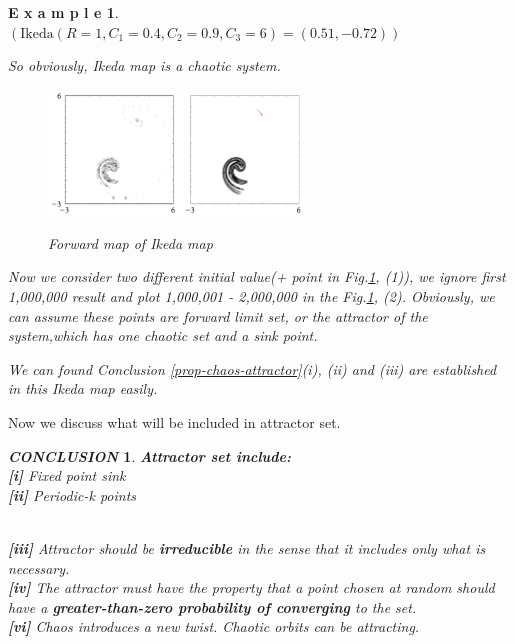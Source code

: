 \documentclass[12pt]{article}
\theoremstyle{plain}
\newtheorem{example}{\textbf{E x a m p l e}}[section]
\newtheorem{conclusion}{\textit{\textbf{CONCLUSION}}}[section]
\begin{document}
\begin{example}
$(\text{Ikeda}(R=1, C_1=0.4, C_2=0.9, C_3=6) = (0.51, -0.72))$

So obviously, Ikeda map is a chaotic system.

\begin{figure}[H]
\begin{center}
\includegraphics[width=0.6\textwidth]{figure/section7/Ikeda-intro-attrractor.png} \\
\caption{Forward map of Ikeda map}\label{Ikeda-intro}
\end{center}
\end{figure}

Now we consider two different initial value(+ point in Fig.\ref{Ikeda-intro}, (1)), we ignore first 1,000,000 result and plot 1,000,001 - 2,000,000 in the Fig.\ref{Ikeda-intro}, (2). Obviously, we can assume these points are forward limit set, or the attractor of the system,which has one chaotic set and a sink point. 

We can found Conclusion \ref{prop-chaos-attractor}(i), (ii) and (iii) are established in this Ikeda map easily.
\end{example}


Now we discuss what will be included in attractor set.
\begin{conclusion}\textbf{Attractor set include: }
\\\noindent \textbf{[i]} Fixed point sink
\\\noindent \textbf{[ii]} Periodic-k points

\\\noindent \textbf{[iii]} Attractor should be \textbf{irreducible} in the sense that it includes only what is necessary. 
\\\noindent \textbf{[iv]} The attractor must have the property that a point chosen at random should have a \textbf{greater-than-zero probability of converging} to the set.
\\\noindent \textbf{[vi]} Chaos introduces a new twist. Chaotic orbits can be attracting.
\end{conclusion}
\end{document}
